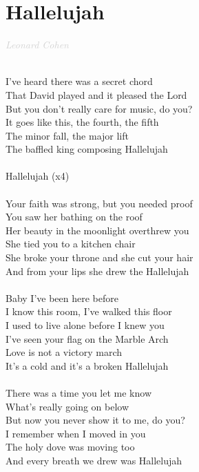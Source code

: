 \documentclass[a5paper, 10pt]{book}
\begin{document}
\section{Hallelujah}\textcolor{lightgray}{\textit{Leonard Cohen}}\\~\\
\begin{minipage}[t]{0.8\textwidth}
I've heard there was a secret chord\\
That David played and it pleased the Lord\\
But you don't really care for music, do you?\\
It goes like this, the fourth, the fifth\\
The minor fall, the major lift\\
The baffled king composing Hallelujah\\
\\
\hspace*{6mm}Hallelujah (x4)\\
\\
Your faith was strong, but you needed proof\\
You saw her bathing on the roof\\
Her beauty in the moonlight overthrew you\\
She tied you to a kitchen chair\\
She broke your throne and she cut your hair\\
And from your lips she drew the Hallelujah\\
\\
Baby I've been here before\\
I know this room, I've walked this floor\\
I used to live alone before I knew you\\
I've seen your flag on the Marble Arch\\
Love is not a victory march\\
It's a cold and it's a broken Hallelujah\\
\\
There was a time you let me know\\
What's really going on below\\
But now you never show it to me, do you?\\
I remember when I moved in you\\
The holy dove was moving too\\
And every breath we drew was Hallelujah\\
\\

\end{minipage}
\end{document}
